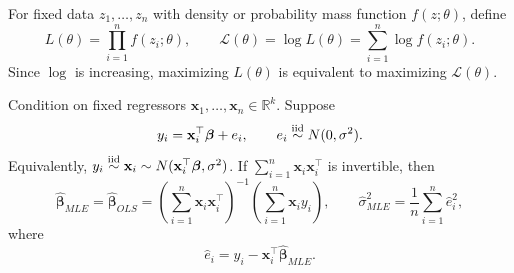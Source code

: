 \begin{definition}
For fixed data $z_1,\ldots,z_n$ with density or probability mass function
$f(z;\theta)$, define
\[
    L(\theta)=\prod_{i=1}^n f(z_i;\theta),
    \qquad
    \mathcal{L}(\theta)=\log L(\theta)
    =
    \sum_{i=1}^n \log f(z_i;\theta).
\]
Since $\log$ is increasing, maximizing $L(\theta)$ is equivalent to maximizing
$\mathcal{L}(\theta)$.
\end{definition}


\begin{theorem}
Condition on fixed regressors $\mathbf{x}_1,\ldots,\mathbf{x}_n\in\mathbb{R}^k$.
Suppose
\[
    y_i=\mathbf{x}_i^{\top}\boldsymbol{\beta}+e_i,
    \qquad
    e_i\overset{\text{iid}}{\sim} N(0,\sigma^2).
\]
Equivalently, $y_i\overset{\text{iid}}{\sim}\mathbf{x}_i\sim N(\mathbf{x}_i^{\top}\boldsymbol{\beta},\sigma^2)$. If $\sum_{i=1}^n\mathbf{x}_i\mathbf{x}_i^{\top}$ is invertible, then
\[
    \widehat{\boldsymbol{\beta}}_{MLE}=\widehat{\boldsymbol{\beta}}_{OLS}
    =
    \left(\sum_{i=1}^n \mathbf{x}_i\mathbf{x}_i^{\top}\right)^{-1}
    \left(\sum_{i=1}^n \mathbf{x}_i y_i\right),
    \qquad
    \widehat\sigma^2_{MLE}
    =
    \frac{1}{n}\sum_{i=1}^n\widehat e_i^2,
\]
where
\[
    \widehat e_i=y_i-\mathbf{x}_i^{\top}\widehat{\boldsymbol{\beta}}_{MLE}.
\]
\end{theorem}

